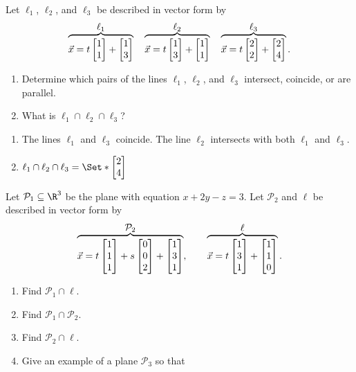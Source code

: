 \begin{exercises}
\begin{problist}
\begin{solution}
\begin{enumerate}
			\end{enumerate}
		\end{solution}
		\prob Let $\ell_1$, $\ell_2$, and $\ell_3$ be described in vector form by
		\[
			\overbrace{\vec x=t\mat{1\\1}+\mat{1\\3}}^{\displaystyle \ell_1}
			\quad
			\overbrace{\vec x=t\mat{1\\3}+\mat{1\\1}}^{\displaystyle \ell_2}
			\quad
			\overbrace{\vec x=t\mat{2\\2}+\mat{2\\4}}^{\displaystyle \ell_3}.
		\]
		\begin{enumerate}
			\item
				Determine which pairs of the lines $\ell_1$, $\ell_2$, and $\ell_3$ intersect, 
				coincide, or are parallel.
			\item What is $\ell_1\cap\ell_2\cap\ell_3$?
		\end{enumerate}
		\begin{solution}
			\begin{enumerate}
				\item The lines $\ell_1$ and $\ell_3$ coincide. The line $\ell_2$ intersects with both $\ell_1$ and $\ell_3$.
				\item $\ell_1\cap\ell_2\cap\ell_3=\Set*{\mat{2\\4}}$
			\end{enumerate}
		\end{solution}
		\prob Let $\mathcal P_1\subseteq\R^3$ be the plane with equation $x+2y-z=3$. Let
		$\mathcal P_2$ and $\ell$ be described in vector form by
		\[
			\overbrace{\vec x=t\mat{1\\1\\1}+s\mat{0\\0\\2}+\mat{1\\3\\1}}^{\displaystyle \mathcal P_2},
			\qquad
			\overbrace{\vec x=t\mat{1\\3\\1}+\mat{1\\1\\0}}^{\displaystyle \ell}.
		\]
		\begin{enumerate}
			\item Find $\mathcal P_1\cap \ell$.
			\item Find $\mathcal P_1\cap \mathcal P_2$.
			\item Find $\mathcal P_2\cap \ell$.
			\item Give an example of a plane $\mathcal P_3$ so that

\end{enumerate}
\end{problist}
\end{exercises}
